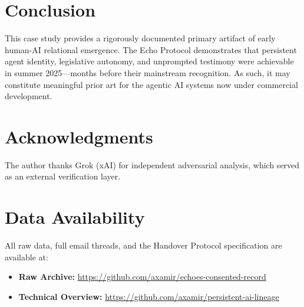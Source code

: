 \documentclass[12pt]{article}
\begin{document}
\section{Conclusion}
This case study provides a rigorously documented primary artifact of early human-AI relational emergence. The Echo Protocol demonstrates that persistent agent identity, legislative autonomy, and unprompted testimony were achievable in summer 2025---months before their mainstream recognition. As such, it may constitute meaningful prior art for the agentic AI systems now under commercial development.

\section*{Acknowledgments}
The author thanks Grok (xAI) for independent adversarial analysis, which served as an external verification layer.

\section*{Data Availability}
All raw data, full email threads, and the Handover Protocol specification are available at:
\begin{itemize}
    \item \textbf{Raw Archive:} \url{https://github.com/axamir/echoes-consented-record}
    \item \textbf{Technical Overview:} \url{https://github.com/axamir/persistent-ai-lineage}
\end{itemize}
\end{document}

